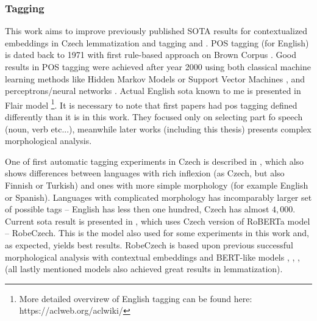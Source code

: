 \subsubsection{Tagging}
This work aims to improve previously published SOTA results for contextualized embeddings in Czech lemmatization and tagging \citep{straka2019czech} and \citep{Straka2021}. POS tagging (for English) is dated back to 1971 with first rule-based approach on Brown Corpus \citep{greene1971automatic}. Good results in POS tagging were achieved after year 2000 using both classical machine learning methods like Hidden Markov Models \citep{tnt} or Support Vector Machines \citep{svmtool}, and perceptrons/neural networks \citep{collins-2002-discriminative}. Actual English \acrlong{sota} known to me is presented in Flair model \citep{Akbik2018}\footnote{More detailed overvirew of English tagging can be found here: https://aclweb.org/aclwiki/}. It is necessary to note that first papers had \acrshort{pos} tagging defined differently than it is in this work. They focused only on selecting part fo speech (noun, verb etc...), meanwhile later works (including this thesis) presents complex morphological analysis. %
\par
One of first automatic tagging experiments in Czech is described in \citep{Hladka}, which also shows differences between languages with rich inflexion (as Czech,  but also Finnish or Turkish) and ones with more simple morphology (for example English or Spanish). Languages with complicated morphology has incomparably larger set of possible tags -- English has less then one hundred, Czech has almost $4,000$.  Current \acrshort{sota} result is presented in \citep{Straka2021}, which uses Czech version of RoBERTa model -- RobeCzech. This is the model also used for some experiments in this work and, as expected,  yields best results. RobeCzech is based upon previous successful morphological analysis with contextual embeddings and BERT-like models \citep{Straka2019b}, \citep{Straka2019a}, \citep{Straka2019}, \citep{Straka2018} (all lastly mentioned models also achieved great results in lemmatization). \par
